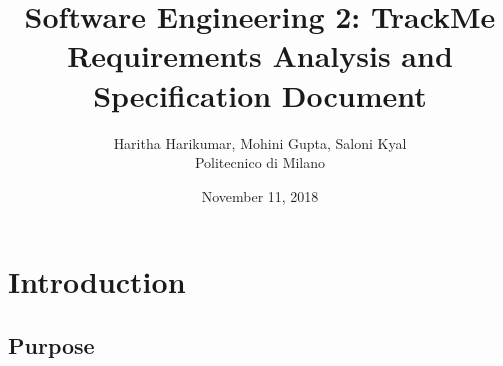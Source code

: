 \documentclass[12pt, a4paper]{report}
\begin{document}
\title{Software Engineering 2: TrackMe \\ \vspace{1em} Requirements Analysis and Specification Document}
\author{Haritha Harikumar, Mohini Gupta, Saloni Kyal\\
Politecnico di Milano}
\date{November 11, 2018}
\maketitle
\tableofcontents

\chapter{Introduction}
\label{ch:introduction}

\section{Purpose}


%

%

%

%

%

\end{document}
